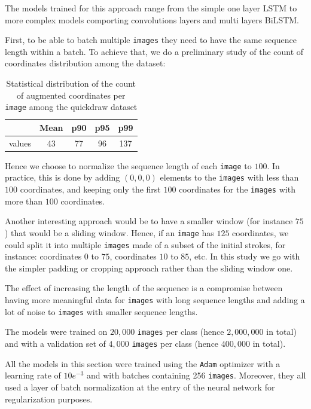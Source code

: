 \documentclass[10pt,twocolumn,letterpaper]{article}
\begin{document}
The models trained for this approach range from the simple one layer LSTM to more complex models comporting convolutions layers and multi layers BiLSTM.

First, to be able to batch multiple \texttt{images} they need to have the same sequence length within a batch. To achieve that, we do a preliminary study of the count of coordinates distribution among the dataset:

\begin{table}[h]
    \centering
    \begin{tabular}{c|c|c|c|c}
          & \textbf{Mean} & \textbf{p90} & \textbf{p95} & \textbf{p99} \\
          \hline
         values & 43 & 77 & 96 & 137
    \end{tabular}
    \caption{Statistical distribution of the count of augmented coordinates per \texttt{image} among the quickdraw dataset}
    \label{tab:strokes_stats}
\end{table}

Hence we choose to normalize the sequence length of each \texttt{image} to $100$. In practice, this is done by adding $(0, 0, 0)$ elements to the \texttt{images} with less than $100$ coordinates, and keeping only the first $100$ coordinates for the \texttt{images} with more than $100$ coordinates.

Another interesting approach would be to have a smaller window (for instance $75$) that would be a sliding window. Hence, if an \texttt{image} has $125$ coordinates, we could split it into multiple \texttt{images} made of a subset of the initial strokes, for instance: coordinates $0$ to $75$, coordinates $10$ to $85$, etc. 
In this study we go with the simpler padding or cropping approach rather than the sliding window one.

The effect of increasing the length of the sequence is a compromise between having more meaningful data for \texttt{images} with long sequence lengths and adding a lot of noise to \texttt{images} with smaller sequence lengths. 


The models were trained on $20,000$ \texttt{images} per class (hence $2,000,000$ in total) and with a validation set of $4,000$ \texttt{images} per class (hence $400,000$ in total).

All the models in this section were trained using the \texttt{Adam} optimizer \cite{kingma2014adam} with a learning rate of $10e^{-3}$ and with batches containing 256 \texttt{images}. Moreover, they all used a layer of batch normalization \cite{ioffe2015batch} at the entry of the neural network for regularization purposes. 
\end{document}
